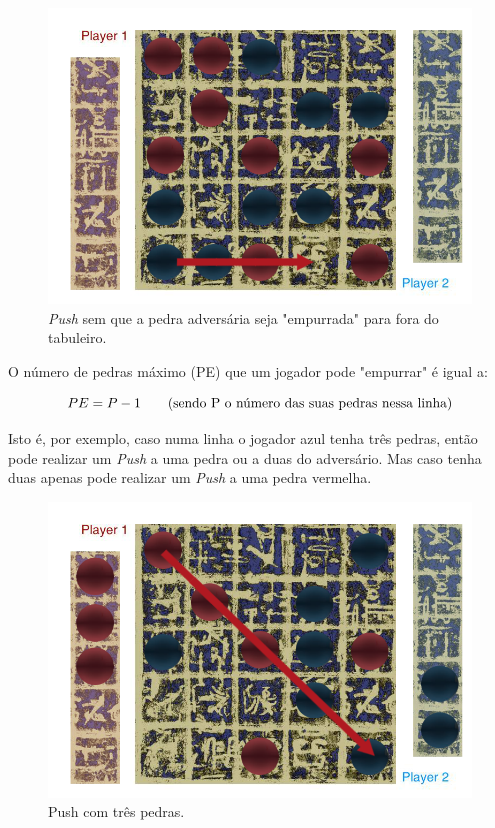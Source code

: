 \documentclass[a4paper]{article}
\begin{document}
\begin{figure}[!htb]
	\centering
	\includegraphics[scale=0.3]{images/push_not_poll.png} 
	\caption{\textit{Push} sem que a pedra adversária seja "empurrada" para fora do tabuleiro.}
\end{figure}

O número de pedras máximo (PE) que um jogador pode "empurrar" é igual a:

\begin{equation}
	PE = P - 1 \text{\hspace{7mm}(sendo P o número das suas pedras nessa linha)}
\end{equation}

\newpage

Isto é, por exemplo, caso numa linha o jogador azul tenha três pedras, então pode realizar um  \textit{Push} a uma pedra ou a duas do adversário. Mas caso tenha duas apenas pode realizar um  \textit{Push} a uma pedra vermelha.

\begin{figure}[!htb]
	\centering
	\includegraphics[scale=0.3]{images/push_3_stones.png}
	\caption{Push com três pedras.}
\end{figure}
\end{document}

